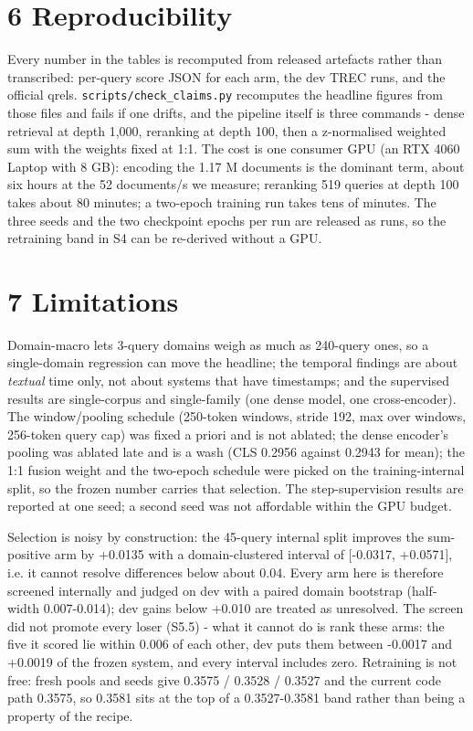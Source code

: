\documentclass[11pt]{article}
\begin{document}
\section*{6 Reproducibility}
Every number in the tables is recomputed from released artefacts rather than transcribed: per-query score JSON for each arm, the dev TREC runs, and the official qrels. \texttt{scripts/check\_claims.py} recomputes the headline figures from those files and fails if one drifts, and the pipeline itself is three commands - dense retrieval at depth 1,000, reranking at depth 100, then a z-normalised weighted sum with the weights fixed at 1:1. The cost is one consumer GPU (an RTX 4060 Laptop with 8 GB): encoding the 1.17 M documents is the dominant term, about six hours at the 52 documents/s we measure; reranking 519 queries at depth 100 takes about 80 minutes; a two-epoch training run takes tens of minutes. The three seeds and the two checkpoint epochs per run are released as runs, so the retraining band in S4 can be re-derived without a GPU.

\section*{7 Limitations}
Domain-macro lets 3-query domains weigh as much as 240-query ones, so a single-domain regression can move the headline; the temporal findings are about \emph{textual} time only, not about systems that have timestamps; and the supervised results are single-corpus and single-family (one dense model, one cross-encoder). The window/pooling schedule (250-token windows, stride 192, max over windows, 256-token query cap) was fixed a priori and is not ablated; the dense encoder’s pooling was ablated late and is a wash (CLS 0.2956 against 0.2943 for mean); the 1:1 fusion weight and the two-epoch schedule were picked on the training-internal split, so the frozen number carries that selection. The step-supervision results are reported at one seed; a second seed was not affordable within the GPU budget.

Selection is noisy by construction: the 45-query internal split improves the sum-positive arm by +0.0135 with a domain-clustered interval of [-0.0317, +0.0571], i.e. it cannot resolve differences below about 0.04. Every arm here is therefore screened internally and judged on dev with a paired domain bootstrap (half-width 0.007-0.014); dev gains below +0.010 are treated as unresolved. The screen did not promote every loser (S5.5) - what it cannot do is rank these arms: the five it scored lie within 0.006 of each other, dev puts them between -0.0017 and +0.0019 of the frozen system, and every interval includes zero. Retraining is not free: fresh pools and seeds give 0.3575 / 0.3528 / 0.3527 and the current code path 0.3575, so 0.3581 sits at the top of a 0.3527-0.3581 band rather than being a property of the recipe.
\end{document}
